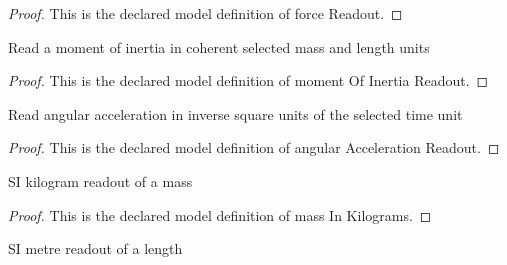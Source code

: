 \begin{proof}
  This is the declared model definition of force Readout.
\end{proof}
\begin{definition}
  \label{def:physics:phyx-mini-0785:phyxminiproblems-problemphyxmini0785-momentofinertiareadout}
  Read a moment of inertia in coherent selected mass and length units
\end{definition}
\begin{proof}
  This is the declared model definition of moment Of Inertia Readout.
\end{proof}
\begin{definition}
  \label{def:physics:phyx-mini-0785:phyxminiproblems-problemphyxmini0785-angularaccelerationreadout}
  Read angular acceleration in inverse square units of the selected time unit
\end{definition}
\begin{proof}
  This is the declared model definition of angular Acceleration Readout.
\end{proof}
\begin{definition}
  \label{def:physics:phyx-mini-0785:phyxminiproblems-problemphyxmini0785-massinkilograms}
  SI kilogram readout of a mass
\end{definition}
\begin{proof}
  This is the declared model definition of mass In Kilograms.
\end{proof}
\begin{definition}
  \label{def:physics:phyx-mini-0785:phyxminiproblems-problemphyxmini0785-lengthinmeters}
  SI metre readout of a length
\end{definition}
